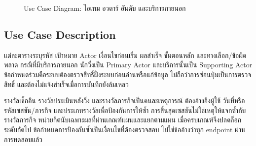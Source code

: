 \begin{figure}[H]\centering


\caption{Use Case Diagram: ไอเทม อวตาร์ อันดับ และบริการภายนอก}\label{fig:usecase-group-5}

\end{figure}

\subsection{Use Case Description}
แต่ละตารางระบุรหัส เป้าหมาย Actor เงื่อนไขก่อนเริ่ม ผลสำเร็จ ขั้นตอนหลัก และทางเลือก/ข้อผิดพลาด กรณีที่มีบริการภายนอก นักวิ่งเป็น Primary Actor และบริการนั้นเป็น Supporting Actor ข้อกำหนดร่วมคือระบบต้องตรวจสิทธิ์ฝั่งระบบก่อนอ่านหรือแก้ข้อมูล ไม่ถือว่าการซ่อนปุ่มเป็นการตรวจสิทธิ์ และต้องไม่แจ้งสำเร็จเมื่อการบันทึกยังล้มเหลว

รางวัลเช็กอิน รางวัลประเมินหลังวิ่ง และรางวัลภารกิจเป็นคนละเหตุการณ์ ต้องอ้างอิงผู้ใช้ วันที่หรือรหัสเซสชัน/ภารกิจ และประเภทรางวัลเพื่อป้องกันการให้ซ้ำ การสิ้นสุดเซสชันไม่ใช่เหตุให้แจกซ้ำกับรางวัลภารกิจ หน่วยกิตนับเฉพาะผลที่ผ่านเกณฑ์แผนและแยกตามแผน เมื่อครบเกณฑ์จึงปลดล็อกระดับถัดไป ข้อกำหนดการป้องกันซ้ำเป็นเงื่อนไขที่ต้องตรวจสอบ ไม่ใช่ข้ออ้างว่าทุก endpoint ผ่านการทดสอบแล้ว

